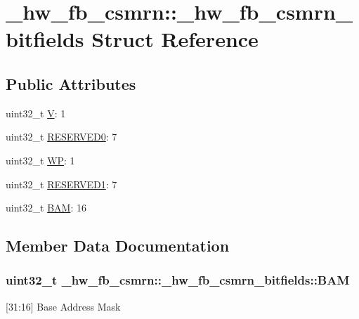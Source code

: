 \hypertarget{struct__hw__fb__csmrn_1_1__hw__fb__csmrn__bitfields}{}\section{\+\_\+hw\+\_\+fb\+\_\+csmrn\+:\+:\+\_\+hw\+\_\+fb\+\_\+csmrn\+\_\+bitfields Struct Reference}
\label{struct__hw__fb__csmrn_1_1__hw__fb__csmrn__bitfields}
\subsection*{Public Attributes}
\begin{DoxyCompactItemize}
\item 
uint32\+\_\+t \hyperlink{struct__hw__fb__csmrn_1_1__hw__fb__csmrn__bitfields_aa71fccd55e1efa89e59375f9493ecfd4}{V}\+: 1
\item 
uint32\+\_\+t \hyperlink{struct__hw__fb__csmrn_1_1__hw__fb__csmrn__bitfields_a36a22269d5e9e26509ad39db3e37ec5a}{R\+E\+S\+E\+R\+V\+E\+D0}\+: 7
\item 
uint32\+\_\+t \hyperlink{struct__hw__fb__csmrn_1_1__hw__fb__csmrn__bitfields_ac88d3718c7a5e3b0ccfc223c895c6fea}{WP}\+: 1
\item 
uint32\+\_\+t \hyperlink{struct__hw__fb__csmrn_1_1__hw__fb__csmrn__bitfields_a3823ab74df5b31f29c1bcd9997997433}{R\+E\+S\+E\+R\+V\+E\+D1}\+: 7
\item 
uint32\+\_\+t \hyperlink{struct__hw__fb__csmrn_1_1__hw__fb__csmrn__bitfields_a5546f4204924500587334636c9040d9e}{B\+AM}\+: 16
\end{DoxyCompactItemize}


\subsection{Member Data Documentation}
\subsubsection[{\texorpdfstring{B\+AM}{BAM}}]{\setlength{\rightskip}{0pt plus 5cm}uint32\+\_\+t \+\_\+hw\+\_\+fb\+\_\+csmrn\+::\+\_\+hw\+\_\+fb\+\_\+csmrn\+\_\+bitfields\+::\+B\+AM}\hypertarget{struct__hw__fb__csmrn_1_1__hw__fb__csmrn__bitfields_a5546f4204924500587334636c9040d9e}{}\label{struct__hw__fb__csmrn_1_1__hw__fb__csmrn__bitfields_a5546f4204924500587334636c9040d9e}
\mbox{[}31\+:16\mbox{]} Base Address Mask 
